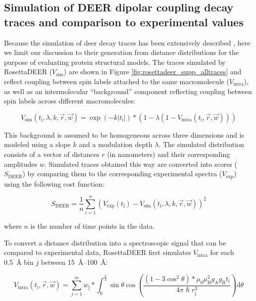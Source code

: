 \subsection{Simulation of DEER dipolar coupling decay traces and comparison to experimental values}

Because the simulation of \gls{deer} decay traces has been extensively described \citep*{Hustedt2018, Jeschke2012, Jeschke2006, Marinelli2019}, here we limit our discussion to their generation from distance distributions for the purpose of evaluating protein structural models. The traces simulated by RosettaDEER ($V_{\mathup{sim}}$) are shown in Figure \ref{fig:rosettadeer_supp_alltraces} and reflect coupling between spin labels attached to the same macromolecule ($V_{\mathup{intra}}$), as well as an intermolecular “background” component reflecting coupling between spin labels across different macromolecules:

\begin{equation}\label{eq:rosettadeer_decay_complete}
V_{\mathup{sim}}\left(t_{\mathup{i}},\lambda,k,\vec{r},\vec{w}\right)=\exp\left(-k | t_{\mathup{i}} | \right)*\left(1-\lambda \left(1-V_{\mathup{intra}}\left(t_{\mathup{i}},\vec{r},\vec{w}\right)\right)\right)
\end{equation}

This background is assumed to be homogeneous across three dimensions and is modeled using a slope $k$ and a modulation depth $\lambda$. The simulated distribution consists of a vector of distances $r$ (in nanometers) and their corresponding amplitudes $w$. Simulated traces obtained this way are converted into scores ($S_{\mathup{DEER}}$) by comparing them to the corresponding experimental spectra ($V_{\mathup{exp}}$) using the following cost function:

\begin{equation}\label{eq:rosettadeer_scorefxn}
S_{\mathup{DEER}} = \frac{1}{n} \sum^{n}_{i=1} \left(V_{\mathup{exp}}\left(t_{\mathup{i}}\right)-V_{\mathup{sim}}\left(t_{\mathup{i}},\lambda,k,\vec{r},\vec{w}\right)\right)^{2}
\end{equation}

where $n$ is the number of time points in the data.

To convert a distance distribution into a spectroscopic signal that can be compared to experimental data, RosettaDEER first simulates $V_{\mathup{intra}}$ for each \SI{0.5}{\angstrom} bin $j$ between \SIrange{15}{100}{\angstrom}:

\begin{equation}
V_{\mathup{intra}}\left(t_{\mathup{i}},\vec{r},\vec{w}\right)=\sum^{m}_{j=1}w_{\mathup{j}}*\int_{0}^{\frac{\pi}{2}}\sin \theta \cos \left(\frac{\left(1-3 \cos^2 \theta\right)*\mu_{\mathup{0}} \mu_{\mathup{B}}^{2} g_{\mathup{A}} g_{\mathup{B}} t_{\mathup{i}} }{4 \pi \hslash r_{\mathup{j}}^{3}}\right) \mathup{d} \theta
\label{eq:rosettadeer_kernel}
\end{equation}

